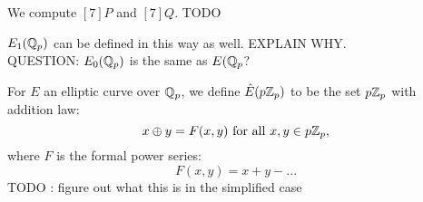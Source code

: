 \begin{ex}
We compute $[7]P$ and $[7]Q$.
TODO
\end{ex}

\begin{rmk}
$E_1(\mathbb{Q}_p)$ can be defined in this way as well. EXPLAIN WHY. \\
QUESTION: $E_0(\mathbb{Q}_p)$ is the same as $E(\mathbb{Q}_p$?
\end{rmk}

\begin{defn}
For $E$ an elliptic curve over $\mathbb{Q}_p$, we define $\hat{E}(p\mathbb{Z}_p)$ to be the set $p\mathbb{Z}_p$ with
addition law:
$$ x \oplus y = F(x, y) \mathrm{ \ for \ all  \ } x, y \in p\mathbb{Z}_p, $$
where $F$ is the formal power series:
$$ F(x, y) = x + y - ...$$ TODO : figure out what this is in the simplified case
\end{defn}

